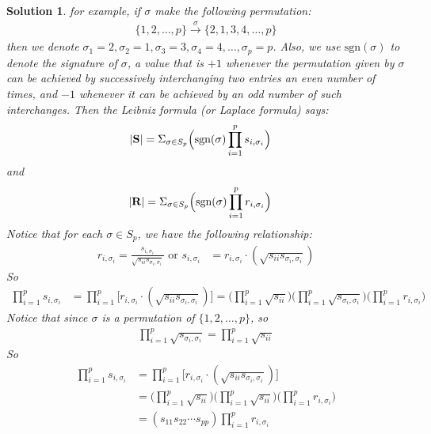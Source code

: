 \documentclass[11pt]{article}
\newtheorem{sol}{Solution}
\begin{document}
\begin{sol}
	for example, if $\sigma$ make the following permutation:
	\begin{align*}
		\{1, 2, \ldots, p\}\stackrel{\sigma}{\to} \{2, 1, 3, 4, \ldots, p\}
	\end{align*} 
	then we denote $\sigma_1 = 2, \sigma_2 = 1, \sigma_3 = 3, \sigma_4 = 4, \ldots, \sigma_p = p$.\vskip 2mm
	Also, we use $\text{sgn}(\sigma)$ to denote the signature of $\sigma$, a value that is $+1$ whenever the permutation given by $\sigma$ can be achieved by successively interchanging two entries an even number of times, and $-1$ whenever it can be achieved by an odd number of such interchanges.\vskip 2mm
	Then the Leibniz formula (or Laplace formula) says:
	\begin{align*}
		|{\bf S}| &= \Sigma_{\sigma \in S_p}\Big(\text{sgn}(\sigma)\prod_{i = 1}^p s_{i, \sigma_i}\Big)
	\end{align*}
	and 
	\begin{align*}
		|{\bf R}| &= \Sigma_{\sigma \in S_p}\Big(\text{sgn}(\sigma)\prod_{i = 1}^p r_{i, \sigma_i}\Big)
	\end{align*}
	Notice that for each $\sigma \in S_p$, we have the following relationship:
	\begin{align*}
		r_{i, \sigma_i} = \frac{s_{i, \sigma_i}}{\sqrt{s_{ii}s_{\sigma_i, \sigma_i}}} \text{ or }s_{i, \sigma_i} &= r_{i, \sigma_i} \cdot (\sqrt{s_{ii}s_{\sigma_i, \sigma_i}})
	\end{align*}
	So
	\begin{align*}
	\prod_{i = 1}^p s_{i, \sigma_i} &= \prod_{i = 1}^p \Big[r_{i, \sigma_i}\cdot (\sqrt{s_{ii}s_{\sigma_i, \sigma_i}})\Big] = \Big(\prod_{i = 1}^p \sqrt{s_{ii}}\Big)\Big(\prod_{i = 1}^p \sqrt{s_{\sigma_i, \sigma_i}}\Big)\Big(\prod_{i = 1}^p r_{i, \sigma_i}\Big)
	\end{align*}
	Notice that since $\sigma$ is a permutation of $\{1, 2, \ldots, p\}$, so
	\begin{align*}
		\prod_{i = 1}^p \sqrt{s_{\sigma_i, \sigma_i}} = \prod_{i = 1}^p\sqrt{s_{ii}}
	\end{align*}
	So
	\begin{align*}
		\prod_{i = 1}^p s_{i, \sigma_i} &= \prod_{i = 1}^p \Big[r_{i, \sigma_i}\cdot (\sqrt{s_{ii}s_{\sigma_i, \sigma_i}})\Big] \\
		&= \Big(\prod_{i = 1}^p\sqrt{s_{ii}}\Big)\Big(\prod_{i = 1}^p\sqrt{s_{ii}}\Big)\Big(\prod_{i = 1}^pr_{i, \sigma_i}\Big)\\
		&= (s_{11}s_{22}\cdots s_{pp})\prod_{i = 1}^pr_{i, \sigma_i}
	\end{align*}

\end{sol}
\end{document}
